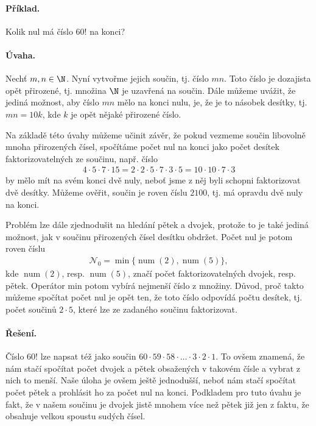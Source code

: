 \documentclass[11pt,a4paper]{article}
\begin{document}
            \paragraph*{Příklad.} Kolik nul má číslo $60!$ na konci?

            \paragraph*{Úvaha.} Nechť $m,n \in \N$. Nyní vytvořme jejich součin, tj. číslo $mn$. Toto číslo je dozajista opět přirozené, tj. množina $\N$ je uzavřená na součin. Dále můžeme uvážit, že jediná možnost, aby číslo $mn$ mělo na konci nulu, je, že je to násobek desítky, tj. $mn = 10k$, kde $k$ je opět nějaké přirozené číslo.

            Na základě této úvahy můžeme učinit závěr, že pokud vezmeme součin libovolně mnoha přirozených čísel, spočítáme počet nul na konci jako počet desítek faktorizovatelných ze součinu, např. číslo
            \begin{align*}
                4\cdot5\cdot7\cdot15 = 2\cdot2\cdot5\cdot7\cdot3\cdot5 = 10\cdot10\cdot7\cdot3
            \end{align*}
            by mělo mít na svém konci dvě nuly, neboť jsme z něj byli schopni faktorizovat dvě desítky. Můžeme ověřit, součin je roven číslu $2100$, tj. má opravdu dvě nuly na konci.

            Problém lze dále zjednodušit na hledání pětek a dvojek, protože to je také jediná možnost, jak v součinu přirozených čísel desítku obdržet. Počet nul je potom roven číslu
            \begin{align*}
                \mathcal N_0 = \min\{\operatorname{num}(2),\operatorname{num}(5)\},
            \end{align*}
            kde $\operatorname{num}(2)$, resp. $\operatorname{num}(5)$, značí počet faktorizovatelných dvojek, resp. pětek. Operátor min potom vybírá nejmenší číslo z množiny. Důvod, proč takto můžeme spočítat počet nul je opět ten, že toto číslo odpovídá počtu desítek, tj. počet součinů $2\cdot5$, které lze ze zadaného součinu faktorizovat.

            \paragraph*{Řešení.} Číslo $60!$ lze napsat též jako součin $60\cdot59\cdot58\cdot \dots \cdot3\cdot2\cdot1$. To ovšem znamená, že nám stačí spočítat počet dvojek a pětek obsažených v takovém čísle a vybrat z nich to menší. Naše úloha je ovšem ještě jednodušší, neboť nám stačí spočítat počet pětek a prohlásit ho za počet nul na konci. Podkladem pro tuto úvahu je fakt, že v našem součinu je dvojek jistě mnohem více než pětek již jen z faktu, že obsahuje velkou spoustu sudých čísel.
\end{document}
